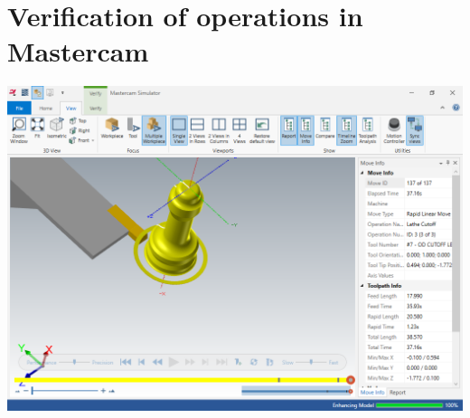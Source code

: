\documentclass{report}
\begin{document}
\chapter{Verification of operations in Mastercam}
\begin{landscape}
\vfill
\includegraphics[width=\linewidth]{img/prj05-mastercam_simulator-verification.png}
\vfill
\end{landscape}
\end{document}
